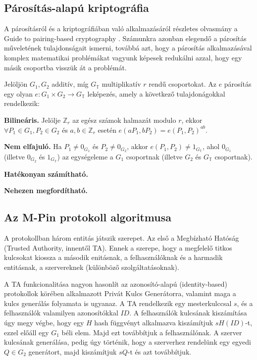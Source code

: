 \subsection{Párosítás-alapú kriptográfia}

A párosításról és a kriptográfiában való alkalmazásáról részletes olvasmány a Guide to pairing-based cryptography \cite{PBCGuide}. Számunkra azonban elegendő a párosítás műveletének tulajdonságait ismerni, továbbá azt, hogy a párosítás alkalmazásával komplex matematikai problémákat vagyunk képesek redukálni azzal, hogy egy másik csoportba visszük át a problémát.

Jelöljön $G_1, G_2$ additív, míg $G_\mathbb{T}$ multiplikatív $r$ rendű csoportokat. Az $e$ párosítás egy olyan $e : G_1 \times G_2 \rightarrow G_\mathbb{T}$ leképezés, amely a következő tulajdonágokkal rendelkezik:
\begin{outdentlist}
    \item[] \textbf{Bilineáris.} Jelölje $\mathbb{Z}_r$ az egész számok halmazát modulo $r$, ekkor $\forall P_1 \in G_1, P_2 \in G_2$ és $a, b \in \mathbb{Z}_r$ esetén $e(aP_1, bP_2) = e(P_1, P_2)^{ab}$.

    \item[] \textbf{Nem elfajuló.} Ha $P_1 \neq 0_{G_1}$ és $P_2 \neq 0_{G_2}$, akkor $e(P_1, P_2) \neq 1_{G_\mathbb{T}}$, ahol $0_{G_1}$ (illetve $0_{G_2}$ és $1_{G_\mathbb{T}}$) az egységeleme a $G_1$ csoportnak (illetve $G_2$ és $G_\mathbb{T}$ csoportnak).

    \item[] \textbf{Hatékonyan számítható.}

    \item[] \textbf{Nehezen megfordítható.}
\end{outdentlist}

\subsection{Az M-Pin protokoll algoritmusa}

A protokollban három entitás játszik szerepet. Az első a Megbízható Hatóság (Trusted Authority, innentől TA). Ennek a szerepe, hogy a megfelelő titkos kulcsokat kiossza a második enitásnak, a felhasználóknak és a harmadik entitásnak, a szervereknek (különböző szolgáltatásoknak). 

A TA funkcionalitása nagyon hasonlít az azonosító-alapú (identity-based) protokollok körében alkalmazott Privát Kulcs Generátorra, valamint maga a kulcs generálás folyamata is ugyanaz. A TA rendelkezik egy mesterkulccsal $s$, és a felhasználók valamilyen azonosítókkal $ID$. A felhasználók kulcsának kiszámítása úgy megy végbe, hogy egy $H$ hash függvényt alkalmazva kiszámítjuk $sH(ID)$-t, ezzel előáll egy $G_1$ béli elem. Majd ezt továbbítjuk a felhasználónak. A szerver kulcsának generálása, pedig úgy történik, hogy a szerverhez rendelünk egy egyedi $Q \in G_2$ generátort, majd kiszámítjuk $sQ$-t és azt továbbítjuk.

